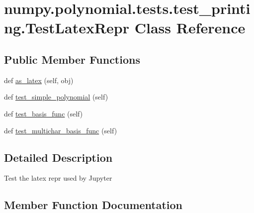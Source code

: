 \hypertarget{classnumpy_1_1polynomial_1_1tests_1_1test__printing_1_1TestLatexRepr}{}\section{numpy.\+polynomial.\+tests.\+test\+\_\+printing.\+Test\+Latex\+Repr Class Reference}
\label{classnumpy_1_1polynomial_1_1tests_1_1test__printing_1_1TestLatexRepr}
\subsection*{Public Member Functions}
\begin{DoxyCompactItemize}
\item 
def \hyperlink{classnumpy_1_1polynomial_1_1tests_1_1test__printing_1_1TestLatexRepr_acbf0b669bc57aa3defdeba21be6a239c}{as\+\_\+latex} (self, obj)
\item 
def \hyperlink{classnumpy_1_1polynomial_1_1tests_1_1test__printing_1_1TestLatexRepr_aad5c5043669a059bf01bd87d587ecd3e}{test\+\_\+simple\+\_\+polynomial} (self)
\item 
def \hyperlink{classnumpy_1_1polynomial_1_1tests_1_1test__printing_1_1TestLatexRepr_ae71e107d5b739f516c7e2376fab15b52}{test\+\_\+basis\+\_\+func} (self)
\item 
def \hyperlink{classnumpy_1_1polynomial_1_1tests_1_1test__printing_1_1TestLatexRepr_ab18b9224e4988ac840fb79fbb583026b}{test\+\_\+multichar\+\_\+basis\+\_\+func} (self)
\end{DoxyCompactItemize}


\subsection{Detailed Description}
\begin{DoxyVerb}Test the latex repr used by Jupyter\end{DoxyVerb}
 

\subsection{Member Function Documentation}
\mbox{\label{classnumpy_1_1polynomial_1_1tests_1_1test__printing_1_1TestLatexRepr_acbf0b669bc57aa3defdeba21be6a239c}} 
